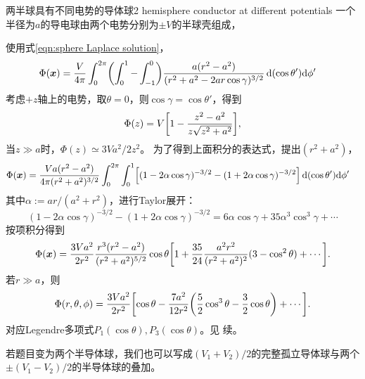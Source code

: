 \begin{example}{两半球具有不同电势的导体球}{2 hemisphere conductor at different potentials}
    一个半径为$a$的导电球由两个电势分别为$\pm V$的半球壳组成，
    \begin{center}
        \label{fig:2 hemisphere}
    \end{center}
    使用式\eqref{eqn:sphere Laplace solution}，
    \begin{align*}
        \Phi(\bm x)&=\frac V{4\pi}\int_0^{2\pi}\biggkh{\int_0^1-\int_{-1}^0}\frac{a(r^2-a^2)}{(r^2+a^2-2ar\cos\gamma)^{3/2}}\d(\cos\theta')\nd\phi'%
    \end{align*}
    考虑$+z$轴上的电势，取$\theta=0$，则$\cos\gamma=\cos\theta'$，得到 
    \begin{equation}
        \Phi(z)=V\biggl[1-\frac{z^2-a^2}{z\sqrt{z^2+a^2}}\biggr],
    \end{equation}
    当$z\gg a$时，$\Phi(z)\simeq 3Va^2/2z^2$。
    \tcblower
    为了得到上面积分的表达式，提出$(r^2+a^2)$，
    \begin{align*}
        \Phi(\bm x)&=\frac{Va(r^2-a^2)}{4\pi(r^2+a^2)^{3/2}}\int_0^{2\pi}\int_0^1\Bigl[(1-2\alpha\cos\gamma)^{-3/2}-(1+2\alpha\cos\gamma)^{-3/2}\Bigr]\mathop{}\!\mathrm{d}(\cos\theta')\mathrm{d}\phi'
    \end{align*}
    其中$\alpha:=ar/(a^2+r^2)$，进行Taylor展开：
    \[
        (1-2\alpha\cos\gamma)^{-3/2}-(1+2\alpha\cos\gamma)^{-3/2}=6\alpha\cos\gamma+35\alpha^3\cos^3\gamma+\cdots
    \]
    按项积分得到
    \[
        \Phi(\bm x)=\frac{3Va^2}{2r^2}\frac{r^3(r^2-a^2)}{(r^2+a^2)^{5/2}}\cos\theta\biggl[1+\frac{35}{24}\frac{a^2r^2}{(r^2+a^2)^2}(3-\cos^2\theta)+\cdots\biggr].
    \]
    若$r\gg a$，则
    \begin{equation}
        \Phi(r,\theta,\phi)=\frac{3Va^2}{2r^2}\biggl[\cos\theta-\frac{7a^2}{12r^2}\biggl(\frac52\cos^3\theta-\frac32\cos\theta\biggr)+\cdots\biggr].
    \end{equation}
    对应Legendre多项式$P_1(\cos\theta),P_3(\cos\theta)$。见 续。
\end{example}
\begin{remark}
    若题目变为两个半导体球，我们也可以写成$(V_1+V_2)/2$的完整孤立导体球与两个$\pm(V_1-V_2)/2$的半导体球的叠加。
\end{remark}

